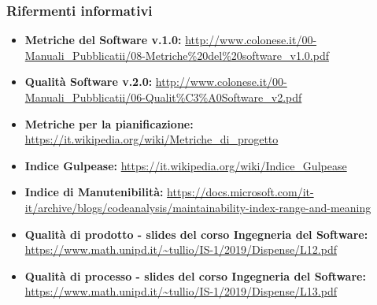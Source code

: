 \subsubsection{Rifermenti informativi}
\begin{itemize}
	\item \textbf{Metriche del Software v.1.0:} \url{http://www.colonese.it/00-Manuali_Pubblicatii/08-Metriche%20del%20software_v1.0.pdf}
		\item \textbf{Qualità Software v.2.0:} \url{http://www.colonese.it/00-Manuali_Pubblicatii/06-Qualit%C3%A0Software_v2.pdf}
	\item \textbf{Metriche per la pianificazione:} \url{https://it.wikipedia.org/wiki/Metriche_di_progetto}
	\item \textbf{Indice Gulpease:} \url{https://it.wikipedia.org/wiki/Indice_Gulpease}
	\item \textbf{Indice di Manutenibilità:} \url{https://docs.microsoft.com/it-it/archive/blogs/codeanalysis/maintainability-index-range-and-meaning}
	\item \textbf{Qualità di prodotto - slides del corso Ingegneria del Software:} \url{https://www.math.unipd.it/~tullio/IS-1/2019/Dispense/L12.pdf}
	\item \textbf{Qualità di processo - slides del corso Ingegneria del Software:} \url{https://www.math.unipd.it/~tullio/IS-1/2019/Dispense/L13.pdf}
\end{itemize}
